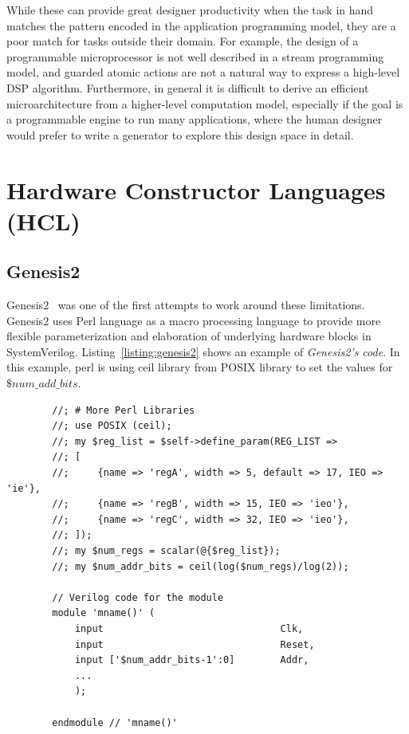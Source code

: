 While these can provide great designer productivity when the task in hand matches the pattern encoded in the application programming model, they are a poor match for tasks outside their domain.
For example, the design of a programmable microprocessor is not well described in a stream
programming model, and guarded atomic actions are not a natural way to express a high-level DSP algorithm.
Furthermore, in general it is difficult to derive an efficient microarchitecture from a higher-level computation model, especially if the goal is a programmable engine to run many applications, where the human designer would prefer to write a generator to explore this design space in detail.


\section{Hardware Constructor Languages (HCL)}


\subsection{Genesis2}
Genesis2~\cite{genesis2} was one of the first attempts to work around these limitations. Genesis2 uses Perl language as a macro processing language to provide more flexible parameterization and elaboration of underlying hardware blocks in SystemVerilog. Listing~\ref{listing:genesis2} shows an example of \textit{Genesis2's code}.
In this example, perl is using ceil library from POSIX library to set the values for $\$num\_add\_bits$.

\begin{listing}[ht]
    \begin{verbatim}
        //; # More Perl Libraries
        //; use POSIX (ceil);
        //; my $reg_list = $self->define_param(REG_LIST => 
        //; [	
        //;     {name => 'regA', width => 5, default => 17, IEO => 'ie'},
        //;     {name => 'regB', width => 15, IEO => 'ieo'},
        //;     {name => 'regC', width => 32, IEO => 'ieo'},
        //; ]);
        //; my $num_regs = scalar(@{$reg_list});
        //; my $num_addr_bits = ceil(log($num_regs)/log(2));

        // Verilog code for the module
        module 'mname()' (
            input                               Clk,
            input                               Reset,
            input ['$num_addr_bits-1':0]        Addr,
            ...
            );

        endmodule // 'mname()'
    \end{verbatim}
    \caption[Caption for LOF]%
    {Genesis2 code example, combining SystemVerilog and Perl~\cite{genesis2}}
    \label{listing:genesis2}
\end{listing}


